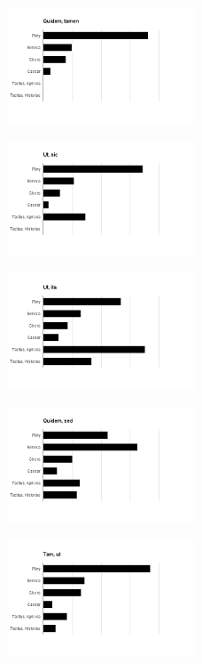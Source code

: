 \begin{figure}
\includegraphics[width=0.5\textwidth]{quidemtamen.png}
\end{figure}

\begin{figure}
\includegraphics[width=0.5\textwidth]{utsic.png}
\end{figure}

\begin{figure}
\includegraphics[width=0.5\textwidth]{utita.png}
\end{figure}

\begin{figure}
\includegraphics[width=0.5\textwidth]{quidemsed.png}
\end{figure}

\begin{figure}
\includegraphics[width=0.5\textwidth]{tamut.png}
\end{figure}

